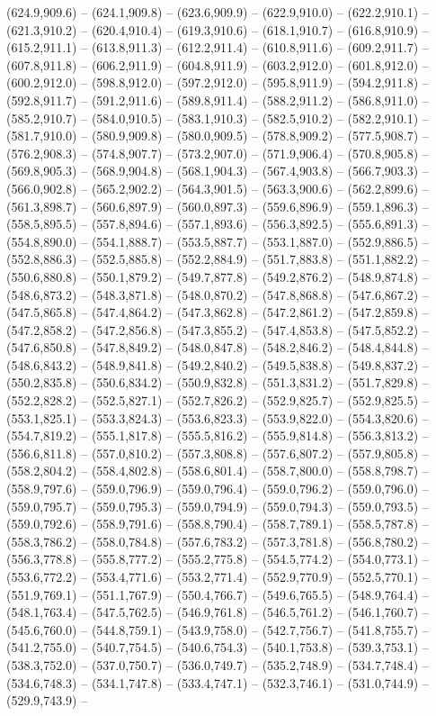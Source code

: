 (624.9,909.6) -- (624.1,909.8) -- (623.6,909.9) -- (622.9,910.0) -- (622.2,910.1) -- (621.3,910.2) -- (620.4,910.4) -- (619.3,910.6) -- (618.1,910.7) -- (616.8,910.9) -- (615.2,911.1) -- (613.8,911.3) -- (612.2,911.4) -- (610.8,911.6) -- (609.2,911.7) -- (607.8,911.8) -- (606.2,911.9) -- (604.8,911.9) -- (603.2,912.0) -- (601.8,912.0) -- (600.2,912.0) -- (598.8,912.0) -- (597.2,912.0) -- (595.8,911.9) -- (594.2,911.8) -- (592.8,911.7) -- (591.2,911.6) -- (589.8,911.4) -- (588.2,911.2) -- (586.8,911.0) -- (585.2,910.7) -- (584.0,910.5) -- (583.1,910.3) -- (582.5,910.2) -- (582.2,910.1) -- (581.7,910.0) -- (580.9,909.8) -- (580.0,909.5) -- (578.8,909.2) -- (577.5,908.7) -- (576.2,908.3) -- (574.8,907.7) -- (573.2,907.0) -- (571.9,906.4) -- (570.8,905.8) -- (569.8,905.3) -- (568.9,904.8) -- (568.1,904.3) -- (567.4,903.8) -- (566.7,903.3) -- (566.0,902.8) -- (565.2,902.2) -- (564.3,901.5) -- (563.3,900.6) -- (562.2,899.6) -- (561.3,898.7) -- (560.6,897.9) -- (560.0,897.3) -- (559.6,896.9) -- (559.1,896.3) -- (558.5,895.5) -- (557.8,894.6) -- (557.1,893.6) -- (556.3,892.5) -- (555.6,891.3) -- (554.8,890.0) -- (554.1,888.7) -- (553.5,887.7) -- (553.1,887.0) -- (552.9,886.5) -- (552.8,886.3) -- (552.5,885.8) -- (552.2,884.9) -- (551.7,883.8) -- (551.1,882.2) -- (550.6,880.8) -- (550.1,879.2) -- (549.7,877.8) -- (549.2,876.2) -- (548.9,874.8) -- (548.6,873.2) -- (548.3,871.8) -- (548.0,870.2) -- (547.8,868.8) -- (547.6,867.2) -- (547.5,865.8) -- (547.4,864.2) -- (547.3,862.8) -- (547.2,861.2) -- (547.2,859.8) -- (547.2,858.2) -- (547.2,856.8) -- (547.3,855.2) -- (547.4,853.8) -- (547.5,852.2) -- (547.6,850.8) -- (547.8,849.2) -- (548.0,847.8) -- (548.2,846.2) -- (548.4,844.8) -- (548.6,843.2) -- (548.9,841.8) -- (549.2,840.2) -- (549.5,838.8) -- (549.8,837.2) -- (550.2,835.8) -- (550.6,834.2) -- (550.9,832.8) -- (551.3,831.2) -- (551.7,829.8) -- (552.2,828.2) -- (552.5,827.1) -- (552.7,826.2) -- (552.9,825.7) -- (552.9,825.5) -- (553.1,825.1) -- (553.3,824.3) -- (553.6,823.3) -- (553.9,822.0) -- (554.3,820.6) -- (554.7,819.2) -- (555.1,817.8) -- (555.5,816.2) -- (555.9,814.8) -- (556.3,813.2) -- (556.6,811.8) -- (557.0,810.2) -- (557.3,808.8) -- (557.6,807.2) -- (557.9,805.8) -- (558.2,804.2) -- (558.4,802.8) -- (558.6,801.4) -- (558.7,800.0) -- (558.8,798.7) -- (558.9,797.6) -- (559.0,796.9) -- (559.0,796.4) -- (559.0,796.2) -- (559.0,796.0) -- (559.0,795.7) -- (559.0,795.3) -- (559.0,794.9) -- (559.0,794.3) -- (559.0,793.5) -- (559.0,792.6) -- (558.9,791.6) -- (558.8,790.4) -- (558.7,789.1) -- (558.5,787.8) -- (558.3,786.2) -- (558.0,784.8) -- (557.6,783.2) -- (557.3,781.8) -- (556.8,780.2) -- (556.3,778.8) -- (555.8,777.2) -- (555.2,775.8) -- (554.5,774.2) -- (554.0,773.1) -- (553.6,772.2) -- (553.4,771.6) -- (553.2,771.4) -- (552.9,770.9) -- (552.5,770.1) -- (551.9,769.1) -- (551.1,767.9) -- (550.4,766.7) -- (549.6,765.5) -- (548.9,764.4) -- (548.1,763.4) -- (547.5,762.5) -- (546.9,761.8) -- (546.5,761.2) -- (546.1,760.7) -- (545.6,760.0) -- (544.8,759.1) -- (543.9,758.0) -- (542.7,756.7) -- (541.8,755.7) -- (541.2,755.0) -- (540.7,754.5) -- (540.6,754.3) -- (540.1,753.8) -- (539.3,753.1) -- (538.3,752.0) -- (537.0,750.7) -- (536.0,749.7) -- (535.2,748.9) -- (534.7,748.4) -- (534.6,748.3) -- (534.1,747.8) -- (533.4,747.1) -- (532.3,746.1) -- (531.0,744.9) -- (529.9,743.9) -- 
